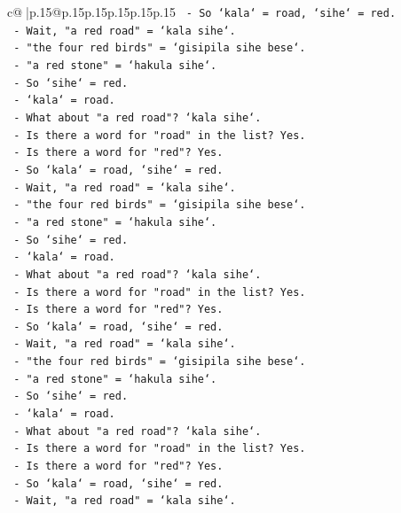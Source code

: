 \documentclass{article}
\begin{document}
{\begin{supertabular}{c@{$\;$}|p{.15\linewidth}@{}p{.15\linewidth}p{.15\linewidth}p{.15\linewidth}p{.15\linewidth}p{.15\linewidth}}
{{{\texttt{  {-} So `kala` = road, `sihe` = red.} \\
\texttt{  {-} Wait, "a red road" = `kala sihe`.} \\
\texttt{  {-} "the four red birds" = `gisipila sihe bese`.} \\
\texttt{  {-} "a red stone" = `hakula sihe`.} \\
\texttt{  {-} So `sihe` = red.} \\
\texttt{  {-} `kala` = road.} \\
\texttt{  {-} What about "a red road"? `kala sihe`.} \\
\texttt{  {-} Is there a word for "road" in the list? Yes.} \\
\texttt{  {-} Is there a word for "red"? Yes.} \\
\texttt{  {-} So `kala` = road, `sihe` = red.} \\
\texttt{  {-} Wait, "a red road" = `kala sihe`.} \\
\texttt{  {-} "the four red birds" = `gisipila sihe bese`.} \\
\texttt{  {-} "a red stone" = `hakula sihe`.} \\
\texttt{  {-} So `sihe` = red.} \\
\texttt{  {-} `kala` = road.} \\
\texttt{  {-} What about "a red road"? `kala sihe`.} \\
\texttt{  {-} Is there a word for "road" in the list? Yes.} \\
\texttt{  {-} Is there a word for "red"? Yes.} \\
\texttt{  {-} So `kala` = road, `sihe` = red.} \\
\texttt{  {-} Wait, "a red road" = `kala sihe`.} \\
\texttt{  {-} "the four red birds" = `gisipila sihe bese`.} \\
\texttt{  {-} "a red stone" = `hakula sihe`.} \\
\texttt{  {-} So `sihe` = red.} \\
\texttt{  {-} `kala` = road.} \\
\texttt{  {-} What about "a red road"? `kala sihe`.} \\
\texttt{  {-} Is there a word for "road" in the list? Yes.} \\
\texttt{  {-} Is there a word for "red"? Yes.} \\
\texttt{  {-} So `kala` = road, `sihe` = red.} \\
\texttt{  {-} Wait, "a red road" = `kala sihe`.} \\
}}}
\end{supertabular}}
\end{document}
